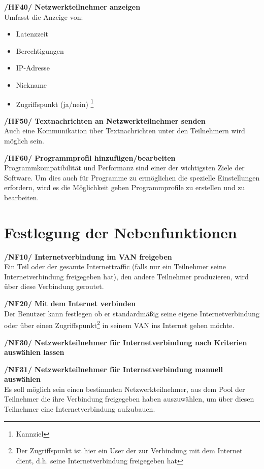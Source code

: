 \documentclass[a4paper,12pt]{scrreprt}
\begin{document}
		
		\textbf { /HF40/ Netzwerkteilnehmer anzeigen
		}\\
		Umfasst die Anzeige von:
		\begin{itemize}
		
	
		\item Latenzzeit
		\item Berechtigungen
		\item IP-Adresse
		\item Nickname
		\item Zugriffspunkt (ja/nein) \footnote{Kannziel}\\
			\end{itemize}
		
		
		
		
		
		\textbf {/HF50/ Textnachrichten an Netzwerkteilnehmer senden}
		\\Auch eine Kommunikation über Textnachrichten unter den Teilnehmern wird möglich sein.
		
		 \textbf {/HF60/ Programmprofil hinzufügen/bearbeiten}
		\\Programmkompatibilität und Performanz sind einer der wichtigsten Ziele der Software. Um dies auch für Programme zu ermöglichen die spezielle Einstellungen erfordern, wird es die Möglichkeit geben Programmprofile zu erstellen und zu bearbeiten.
		
	\section{Festlegung der Nebenfunktionen}
	\textbf { /NF10/ Internetverbindung im VAN freigeben} 
	\\Ein Teil oder der gesamte Internettraffic (falls nur ein Teilnehmer seine Internetverbindung freigegeben hat), den andere Teilnehmer produzieren, wird über diese Verbindung geroutet.
			
	\textbf {/NF20/ Mit dem Internet verbinden} 
	\\Der Benutzer kann festlegen ob er standardmäßig seine eigene Internetverbindung oder über einen Zugriffspunkt\footnote{Der Zugriffspunkt ist hier ein User der zur Verbindung mit dem Internet dient, d.h. seine Internetverbindung freigegeben hat} in seinem VAN ins Internet gehen möchte.
	
	\textbf {/NF30/ Netzwerkteilnehmer für Internetverbindung nach Kriterien auswählen lassen}
	
	\textbf {/NF31/ Netzwerkteilnehmer für Internetverbindung manuell auswählen}
	\\Es soll möglich sein einen bestimmten Netzwerkteilnehmer, aus dem Pool der Teilnehmer die ihre Verbindung freigegeben haben auszuwählen, um über diesen Teilnehmer eine Internetverbindung aufzubauen.
	
\end{document}
